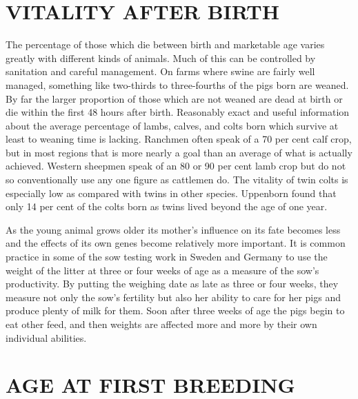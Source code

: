 \section*{VITALITY AFTER BIRTH}

The percentage of those which die between birth and marketable
age varies greatly with different kinds of animals. Much of this can be
controlled by sanitation and careful management. On farms where
swine are fairly well managed, something like two-thirds to three-fourths
of the pigs born are weaned. By far the larger proportion of
those which are not weaned are dead at birth or die within the first 48
hours after birth. Reasonably exact and useful information about the
average percentage of lambs, calves, and colts born which survive at
least to weaning time is lacking. Ranchmen often speak of a 70 per cent
calf crop, but in most regions that is more nearly a goal than an average
of what is actually achieved. Western sheepmen speak of an 80 or 90
per cent lamb crop but do not so conventionally use any one figure as
cattlemen do. The vitality of twin colts is especially low as compared
with twins in other species. Uppenborn found that only 14 per cent of
the colts born as twins lived beyond the age of one year.

As the young animal grows older its mother's influence on its fate
becomes less and the effects of its own genes become relatively more
important. It is common practice in some of the sow testing work in
Sweden and Germany to use the weight of the litter at three or four
weeks of age as a measure of the sow's productivity. By putting the
weighing date as late as three or four weeks, they measure not only the
sow's fertility but also her ability to care for her pigs and produce plenty
of milk for them. Soon after three weeks of age the pigs begin to eat
other feed, and then weights are affected more and more by their own
individual abilities.

\section*{AGE AT FIRST BREEDING}

